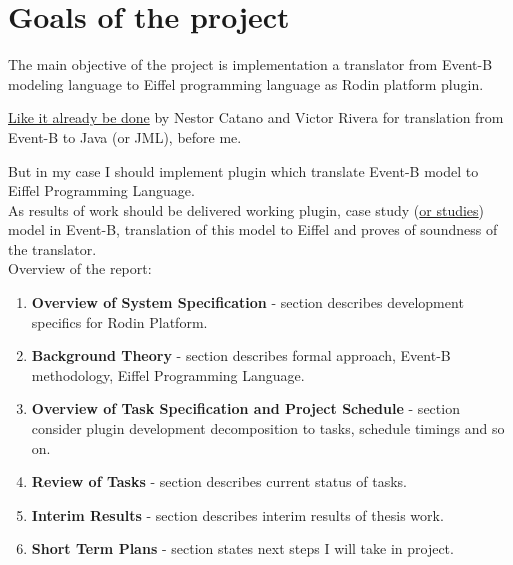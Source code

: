\pagebreak
\section{Goals of the project}

The main objective of the project is implementation a translator from Event-B
modeling language to Eiffel programming language as Rodin platform plugin.

\href{http://poporo.uma.pt/EventB2Java/EventB2Java.html}
{Like it already be done} by Nestor Catano and Victor Rivera for translation from
Event-B to Java (or JML), before me.

But in my case I should implement plugin which translate Event-B model to Eiffel
Programming Language.\\

As results of work should be delivered working plugin, case study
(\href{http://poporo.uma.pt/EventB2Java/EventB2Java_studies.html}{or studies})
model in Event-B, translation of this model to Eiffel and proves of soundness of
the translator.\\

Overview of the report:\\
\begin{enumerate}
\item \textbf{Overview of System Specification}
  - section describes development specifics for Rodin Platform.
 
\item \textbf{Background Theory}
  - section describes formal approach, Event-B methodology, Eiffel
  Programming Language. 

\item \textbf{Overview of Task Specification and Project Schedule}
  - section consider plugin development decomposition to tasks, schedule
  timings and so on.

\item \textbf{Review of Tasks}
  - section describes current status of tasks.

\item \textbf{Interim Results}
  - section describes interim results of thesis work.

\item \textbf{Short Term Plans}
  - section states next steps I will take in project.

\end{enumerate}
